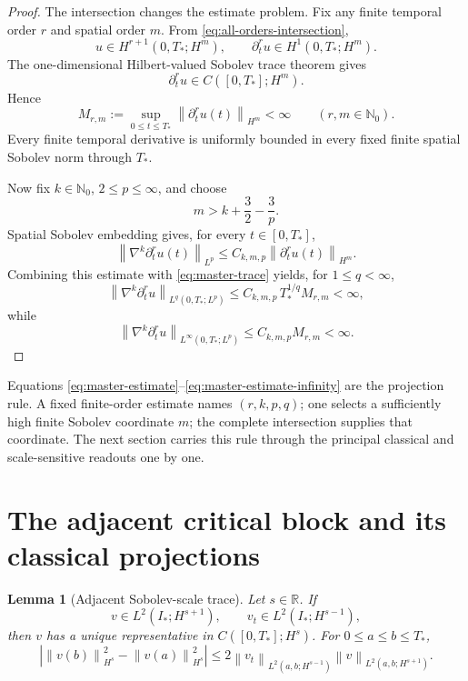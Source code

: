 \documentclass[11pt,letterpaper]{article}
\newtheorem{lemma}[theorem]{Lemma}
\theoremstyle{definition}
\theoremstyle{remark}
\newcommand{\R}{\mathbb R}
\newcommand{\Nzero}{\mathbb N_0}
\newcommand{\norm}[1]{\left\lVert #1\right\rVert}
\newcommand{\Istar}{I_*}
\begin{document}
\begin{proof}
The intersection changes the estimate problem.  Fix any finite temporal
order \(r\) and spatial order \(m\).  From
\eqref{eq:all-orders-intersection},
\[
u\in H^{r+1}(0,T_*;H^m),
\qquad
\partial_t^r u\in H^1(0,T_*;H^m).
\]
The one-dimensional Hilbert-valued Sobolev trace theorem gives
\[
\partial_t^r u\in C([0,T_*];H^m).
\]
Hence
\begin{equation}
\boxed{
M_{r,m}:=
\sup_{0\le t\le T_*}\norm{\partial_t^r u(t)}_{H^m}<\infty}
\qquad (r,m\in\Nzero).
\label{eq:master-trace}
\end{equation}
Every finite temporal derivative is uniformly bounded in every fixed finite
spatial Sobolev norm through \(T_*\).

Now fix \(k\in\Nzero\), \(2\le p\le\infty\), and choose
\[
m>k+\frac32-\frac3p.
\]
Spatial Sobolev embedding gives, for every \(t\in[0,T_*]\),
\[
\norm{\nabla^k\partial_t^r u(t)}_{L^p}
\le C_{k,m,p}\norm{\partial_t^r u(t)}_{H^m}.
\]
Combining this estimate with \eqref{eq:master-trace} yields, for
\(1\le q<\infty\),
\begin{equation}
\boxed{
\norm{\nabla^k\partial_t^r u}_{L^q(0,T_*;L^p)}
\le C_{k,m,p}\,T_*^{1/q}M_{r,m}<\infty,}
\label{eq:master-estimate}
\end{equation}
while
\begin{equation}
\norm{\nabla^k\partial_t^r u}_{L^\infty(0,T_*;L^p)}
\le C_{k,m,p}M_{r,m}<\infty.
\label{eq:master-estimate-infinity}
\end{equation}
\end{proof}

Equations \eqref{eq:master-estimate}--\eqref{eq:master-estimate-infinity}
are the projection rule.  A fixed
finite-order estimate names \((r,k,p,q)\); one selects a sufficiently high
finite Sobolev coordinate \(m\); the complete intersection supplies that
coordinate.  The next section carries this rule through the principal
classical and scale-sensitive readouts one by one.

\section{The adjacent critical block and its classical projections}

\begin{lemma}[Adjacent Sobolev-scale trace]
\label{lem:adjacent-trace}
Let \(s\in\R\).  If
\[
v\in L^2(\Istar;H^{s+1}),
\qquad
v_t\in L^2(\Istar;H^{s-1}),
\]
then \(v\) has a unique representative in \(C([0,T_*];H^s)\).  For
\(0\le a\le b\le T_*\),
\begin{equation}
\left|
\norm{v(b)}_{H^s}^{2}-\norm{v(a)}_{H^s}^{2}
\right|
\le
2\norm{v_t}_{L^2(a,b;H^{s-1})}
\norm{v}_{L^2(a,b;H^{s+1})}.
\label{eq:adjacent-trace-bound}
\end{equation}
\end{lemma}
\end{document}
